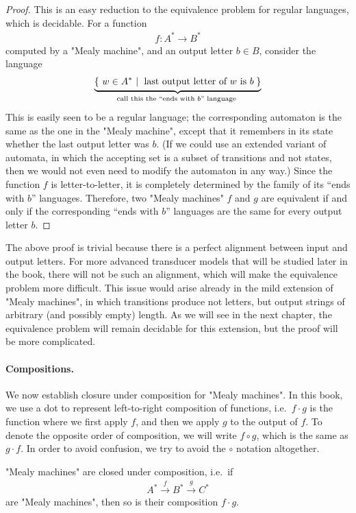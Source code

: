 \begin{proof}
    This is an easy reduction to the equivalence problem for regular languages, which is decidable. For a function 
    \begin{align*}
    f : A^* \to B^*
    \end{align*}
     computed by a "Mealy machine", and an output letter $b \in B$, consider the language 
    \begin{align*}
     \myunderbrace{\setbuild{ w \in A^*}{last output letter of $w$ is $b$}}{call this the ``ends with $b$'' language}
    \end{align*}
    This is easily seen to be a regular language; the corresponding automaton is the same as the one in the "Mealy machine", except that it remembers in its state whether the last output letter was $b$. (If we could use an extended variant of automata, in which the accepting set is a subset of transitions and not states, then we would not even need to modify the automaton in any way.)
    Since the function $f$ is letter-to-letter, it is completely determined by the family of its ``ends with $b$'' languages. Therefore, two "Mealy machines" $f$ and $g$ are equivalent if and only if the corresponding ``ends with $b$'' languages are the same for every output letter $b$.
\end{proof}

The above proof is trivial because there is a perfect alignment between input and output letters. For more advanced transducer models that will be studied later in the book, there will not be such an alignment, which will make the equivalence problem  more difficult. This issue would arise already in the mild extension of "Mealy machines", in which transitions produce not letters, but output strings of arbitrary (and possibly empty) length. As we will see in the next chapter, the equivalence problem will remain decidable for this extension, but the proof will be more complicated. 


\paragraph*{Compositions.} We now establish closure under composition for "Mealy machines". In this book, we use a dot to represent left-to-right composition of functions, i.e.~$f \cdot g$ is the function where we first apply $f$, and then we apply $g$ to the output of $f$. To denote the opposite order of composition, we will write $f \circ g$, which is the same as $g \cdot f$. In order to avoid confusion,  we try to avoid the $\circ$ notation altogether.
\begin{theorem}\label{thm:composition-mealy}
    "Mealy machines" are closed under composition, i.e.~if
    \begin{align*}
    A^* 
    \xrightarrow f 
    B^* 
    \xrightarrow g 
    C^*
    \end{align*}
    are "Mealy machines", then so is their composition $f \cdot g$. 
\end{theorem}

